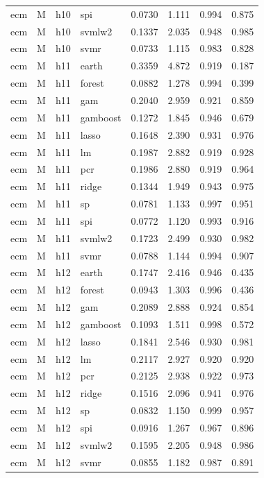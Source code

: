 \begin{ThreePartTable}
\begin{longtable}[t]{llclcccc}
ecm & M & h10 & spi & 0.0730 & 1.111 & 0.994 & 0.875\\
ecm & M & h10 & svmlw2 & 0.1337 & 2.035 & 0.948 & 0.985\\
ecm & M & h10 & svmr & 0.0733 & 1.115 & 0.983 & 0.828\\
\addlinespace
ecm & M & h11 & earth & 0.3359 & 4.872 & 0.919 & 0.187\\
ecm & M & h11 & forest & 0.0882 & 1.278 & 0.994 & 0.399\\
ecm & M & h11 & gam & 0.2040 & 2.959 & 0.921 & 0.859\\
ecm & M & h11 & gamboost & 0.1272 & 1.845 & 0.946 & 0.679\\
ecm & M & h11 & lasso & 0.1648 & 2.390 & 0.931 & 0.976\\
ecm & M & h11 & lm & 0.1987 & 2.882 & 0.919 & 0.928\\
ecm & M & h11 & pcr & 0.1986 & 2.880 & 0.919 & 0.964\\
ecm & M & h11 & ridge & 0.1344 & 1.949 & 0.943 & 0.975\\
ecm & M & h11 & sp & 0.0781 & 1.133 & 0.997 & 0.951\\
ecm & M & h11 & spi & 0.0772 & 1.120 & 0.993 & 0.916\\
ecm & M & h11 & svmlw2 & 0.1723 & 2.499 & 0.930 & 0.982\\
ecm & M & h11 & svmr & 0.0788 & 1.144 & 0.994 & 0.907\\
\addlinespace
ecm & M & h12 & earth & 0.1747 & 2.416 & 0.946 & 0.435\\
ecm & M & h12 & forest & 0.0943 & 1.303 & 0.996 & 0.436\\
ecm & M & h12 & gam & 0.2089 & 2.888 & 0.924 & 0.854\\
ecm & M & h12 & gamboost & 0.1093 & 1.511 & 0.998 & 0.572\\
ecm & M & h12 & lasso & 0.1841 & 2.546 & 0.930 & 0.981\\
ecm & M & h12 & lm & 0.2117 & 2.927 & 0.920 & 0.920\\
ecm & M & h12 & pcr & 0.2125 & 2.938 & 0.922 & 0.973\\
ecm & M & h12 & ridge & 0.1516 & 2.096 & 0.941 & 0.976\\
ecm & M & h12 & sp & 0.0832 & 1.150 & 0.999 & 0.957\\
ecm & M & h12 & spi & 0.0916 & 1.267 & 0.967 & 0.896\\
ecm & M & h12 & svmlw2 & 0.1595 & 2.205 & 0.948 & 0.986\\
ecm & M & h12 & svmr & 0.0855 & 1.182 & 0.987 & 0.891\\

\end{longtable}
\end{ThreePartTable}
